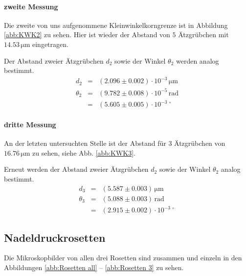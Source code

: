 \documentclass[12pt,a4paper]{scrartcl}
\numberwithin{equation}{section} %
\renewcommand{\[}{} %
\renewcommand{\]}{\noindent} %
\begin{document}
\hypertarget{zweite-messung}{%
\paragraph*{zweite Messung}\label{zweite-messung}}

Die zweite von uns aufgenommene Kleinwinkelkorngrenze ist in Abbildung
\ref{abb:KWK2} zu sehen. Hier ist wieder der Abstand von \(5\) Ätzgrübchen mit
\(14.53 \mathrm{\, \mu m}\) eingetragen.

Der Abstand zweier Ätzgrübchen \(d_2\) sowie der Winkel \(\theta_2\)
werden analog bestimmt. \[
\begin{eqnarray}
    d_2 & = & (2.096\pm 0.002) \cdot 10^{-3} \mathrm{\, \mu m} \\
    \theta_2 &=& (9.782 \pm 0.008) \cdot 10^{-5} \mathrm{\, rad} \\
        &=& (5.605 \pm 0.005) \cdot 10^{-3\ \circ}
\end{eqnarray}
\]

\hypertarget{dritte-messung}{%
\paragraph*{dritte Messung}\label{dritte-messung}}

An der letzten untersuchten Stelle ist der Abstand für \(3\) Ätzgrübchen
von \(16.76 \mathrm{\, \mu m}\) zu sehen, siehe Abb. \ref{abb:KWK3}.

Erneut werden der Abstand zweier Ätzgrübchen \(d_2\) sowie der Winkel
\(\theta_2\) analog bestimmt. \[
\begin{eqnarray}
    d_3 &=& (5.587 \pm 0.003) \mathrm{\, \mu m} \\
    \theta_3 &=& (5.088 \pm 0.003) \mathrm{\, rad} \\
        &=& (2.915 \pm 0.002) \cdot 10^{-3\ \circ}
\end{eqnarray}
\]

\hypertarget{nadeldruckrosetten-1}{%
\subsection{Nadeldruckrosetten}\label{nadeldruckrosetten-1}}

Die Mikroskopbilder von allen drei Rosetten sind zusammen und einzeln in
den Abbildungen \ref{abb:Rosetten all} -- \ref{abb:Rosetten 3} zu sehen.
\end{document}
